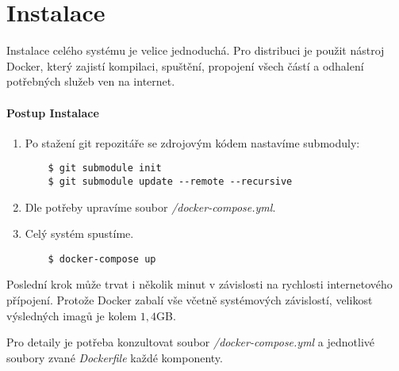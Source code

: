 
\chapter{Instalace} \label{analyza}

\noindent
Instalace celého systému je velice jednoduchá. Pro distribuci je použit nástroj
Docker, který zajistí kompilaci, spuštění, propojení všech částí a odhalení
potřebných služeb ven na internet. \citep[viz][]{DockerDocs}


\subsubsection*{Postup Instalace}

\begin{enumerate}
  \item Po stažení git repozitáře se zdrojovým kódem nastavíme submoduly:\\
  \begin{lstlisting}
    $ git submodule init
    $ git submodule update --remote --recursive
  \end{lstlisting}
  \item Dle potřeby upravíme soubor \textit{/docker-compose.yml}.
  \item Celý systém spustíme.\\
  \begin{lstlisting}
    $ docker-compose up
  \end{lstlisting}
\end{enumerate}

Poslední krok může trvat i několik minut v závislosti na rychlosti internetového
přípojení. Protože Docker zabalí vše včetně systémových závislostí, velikost
výsledných imagů je kolem $1,4$GB.

Pro detaily je potřeba konzultovat soubor \textit{/docker-compose.yml} a jednotlivé soubory
zvané \textit{Dockerfile} každé komponenty.
